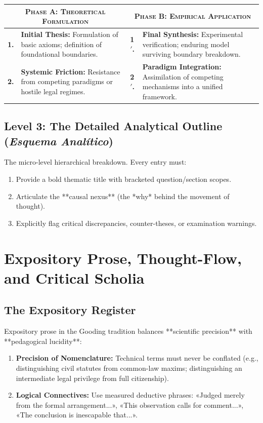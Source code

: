 \documentclass[11pt,letterpaper]{article}
\begin{document}
\begin{center}
\footnotesize
\begin{tabularx}{\linewidth}{@{}l X l X@{}}
  \toprule
  \multicolumn{2}{c}{\textbf{\textsc{Phase A: Theoretical Formulation}}} & 
  \multicolumn{2}{c}{\textbf{\textsc{Phase B: Empirical Application}}} \\
  \midrule
  \textbf{1.} & \textbf{Initial Thesis:} Formulation of basic axioms; definition of foundational boundaries. &
  \textbf{1$'$.} & \textbf{Final Synthesis:} Experimental verification; enduring model surviving boundary breakdown. \\
  \addlinespace[0.4em]
  \textbf{2.} & \textbf{Systemic Friction:} Resistance from competing paradigms or hostile legal regimes. &
  \textbf{2$'$.} & \textbf{Paradigm Integration:} Assimilation of competing mechanisms into a unified framework. \\
  \bottomrule
\end{tabularx}
\end{center}

\subsection{Level 3: The Detailed Analytical Outline (\emph{Esquema Analítico})}
The micro-level hierarchical breakdown. Every entry must:
\begin{enumerate}
  \item Provide a bold thematic title with bracketed question/section scopes.
  \item Articulate the **causal nexus** (the *why* behind the movement of thought).
  \item Explicitly flag critical discrepancies, counter-theses, or examination warnings.
\end{enumerate}

\section{Expository Prose, Thought-Flow, and Critical Scholia}

\subsection{The Expository Register}
Expository prose in the Gooding tradition balances **scientific precision** with **pedagogical lucidity**:
\begin{enumerate}
  \item \textbf{Precision of Nomenclature:} Technical terms must never be conflated (e.g., distinguishing civil statutes from common-law maxims; distinguishing an intermediate legal privilege from full citizenship).
  \item \textbf{Logical Connectives:} Use measured deductive phrases: «Judged merely from the formal arrangement...», «This observation calls for comment...», «The conclusion is inescapable that...».
\end{enumerate}
\end{document}
